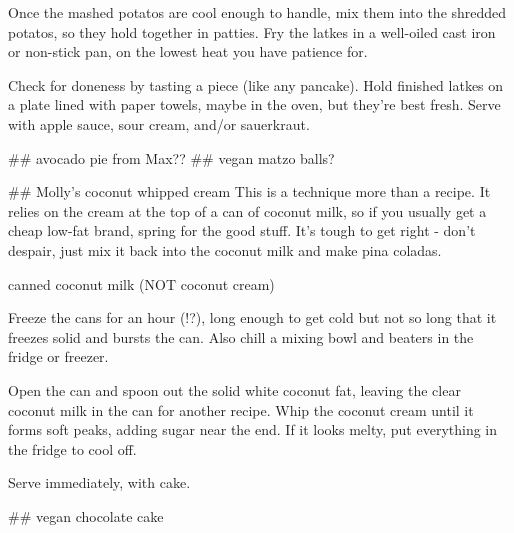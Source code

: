 Once the mashed potatos are cool enough to handle, mix them into the shredded potatos, so they hold together in patties. Fry the latkes in a well-oiled cast iron or non-stick pan, on the lowest heat you have patience for.

Check for doneness by tasting a piece (like any pancake). Hold finished latkes on a plate lined with paper towels, maybe in the oven, but they're best fresh. Serve with apple sauce, sour cream, and/or sauerkraut.

## avocado pie from Max??
## vegan matzo balls?

## Molly's coconut whipped cream
This is a technique more than a recipe. It relies on the cream at the top of a can of coconut milk, so if you usually get a cheap low-fat brand, spring for the good stuff. It's tough to get right - don't despair, just mix it back into the coconut milk and make pina coladas.

canned coconut milk (NOT coconut cream)

Freeze the cans for an hour (!?), long enough to get cold but not so long that it freezes solid and bursts the can. Also chill a mixing bowl and beaters in the fridge or freezer.

Open the can and spoon out the solid white coconut fat, leaving the clear coconut milk in the can for another recipe. Whip the coconut cream until it forms soft peaks, adding sugar near the end. If it looks melty, put everything in the fridge to cool off.

Serve immediately, with cake.

## vegan chocolate cake
